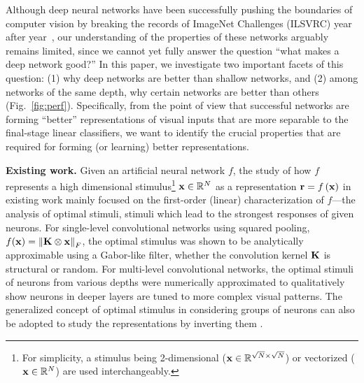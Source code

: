\documentclass[10pt,twocolumn,letterpaper]{article}
\begin{document}
Although deep neural networks have been successfully pushing the boundaries of computer vision by breaking the records of ImageNet Challenges (ILSVRC) year after year~\cite{krizhevsky2012imagenet, sermanet2013overfeat, szegedy2014going}, our understanding of the properties of these networks arguably remains limited, since we cannot yet fully answer the question ``what makes a deep network good?'' In this paper, we investigate two important facets of this question: (1) why deep networks are better than shallow networks, and (2) among networks of the same depth, why certain networks are better than others (Fig.~\ref{fig:perf}). Specifically, from the point of view that successful networks are forming ``better'' representations of visual inputs that are more separable to the final-stage linear classifiers, we want to identify the crucial properties that are required for forming (or learning) better representations.


\newcommand{\expstimdim}{For simplicity, a stimulus being 2-dimensional (\ie ${\bf{x}} \in \mathbb{R}^{\sqrt{N} \times \sqrt{N}}$) or vectorized (\ie ${\bf{x}} \in \mathbb{R}^N$) are used interchangeably.}

{\bf Existing work.} 
Given an artificial neural network $f$, the study of how $f$ represents a high dimensional stimulus\footnote{\expstimdim} ${\bf{x}} \in \mathbb{R}^N$ as a representation 
${\bf{r}} = f\left( {\bf{x}} \right)$ in existing work mainly focused on the first-order (\ie linear) characterization of $f$---the analysis of optimal stimuli, stimuli which lead to the strongest responses of given neurons.
For single-level convolutional networks using squared pooling, \ie $f({\bf{x}}) = \left\| {\bf{K}} \otimes {\bf{x}} \right\|_{F}$, the optimal stimulus was shown to be analytically approximable \cite{saxe2011random} using a Gabor-like filter, whether the convolution kernel $\bf{K}$ is structural or random.
For multi-level convolutional networks, the optimal stimuli of neurons from various depths were numerically approximated \cite{ngiam2010tiled, le2012building, zeiler2014visualizing, simonyan2013deep} to qualitatively show neurons in deeper layers are tuned to more complex visual patterns.
The generalized concept of optimal stimulus in considering groups of neurons can also be adopted to study the representations by inverting them \cite{mahendran2014understanding}.
\end{document}
